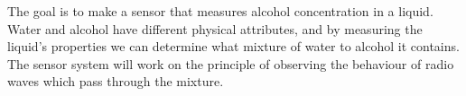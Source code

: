 
The goal is to make a sensor that measures alcohol concentration in a liquid.
Water and alcohol have different physical attributes, and by measuring the liquid's properties we can determine what mixture of water to alcohol it contains.
The sensor system will work on the principle of observing the behaviour of radio waves which pass through the mixture.